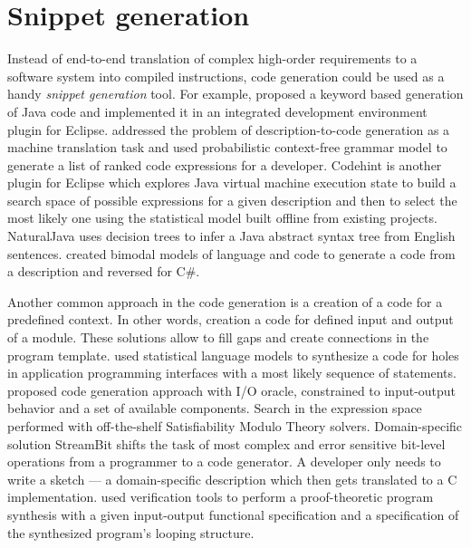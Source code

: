 \section{Snippet generation}
Instead of end-to-end translation of complex high-order requirements to a software system into compiled instructions, code generation could be used as a handy \emph{snippet generation} tool. For example, \cite{little2009keyword} proposed a keyword based generation of Java code and implemented it in an integrated development environment plugin for Eclipse. \cite{Gvero2015} addressed the problem of description-to-code generation as a machine translation task and used probabilistic context-free grammar model to generate a list of ranked code expressions for a developer. Codehint \parencite{Galenson2014} is another plugin for Eclipse which explores Java virtual machine execution state to build a search space of possible expressions for a given description and then to select the most likely one using the statistical model built offline from existing projects. NaturalJava \parencite{Price2000} uses decision trees to infer a Java abstract syntax tree from English sentences. \cite{pmlr-v37-allamanis15} created bimodal models of language and code to generate a code from a description and reversed for C\#.

Another common approach in the code generation is a creation of a code for a predefined context. In other words, creation a code for defined input and output of a module. These solutions allow to fill gaps and create connections in the program template. \cite{Raychev2014} used statistical language models to synthesize a code for holes in application programming interfaces with a most likely sequence of statements. \cite{Jha2010} proposed code generation approach with I/O oracle, constrained to input-output behavior and a set of available components. Search in the expression space performed with off-the-shelf Satisfiability Modulo Theory solvers. Domain-specific solution StreamBit \parencite{Solar-Lezama2005} shifts the task of most complex and error sensitive bit-level operations from a programmer to a code generator. A developer only needs to write a sketch --- a domain-specific description which then gets translated to a C implementation. \cite{Srivastava2010} used verification tools to perform a proof-theoretic program synthesis with a given input-output functional specification and a specification of the synthesized program’s looping structure.

